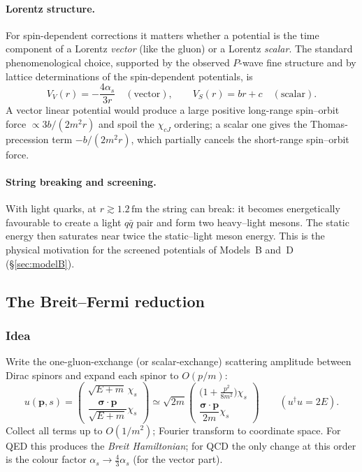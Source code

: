 \documentclass[11pt,a4paper]{article}
\numberwithin{equation}{section}
\theoremstyle{definition}
\theoremstyle{plain}
\theoremstyle{remark}
\numberwithin{algorithm}{section}
\newcommand{\vp}{\bm p}
\newcommand{\vsig}{\bm\sigma}
\newcommand{\as}{\alpha_s}
\newcommand{\fm}{\,\mathrm{fm}}
\begin{document}
\paragraph{Lorentz structure.} For spin-dependent corrections it matters whether a potential is the time component of a Lorentz \emph{vector} (like the gluon) or a Lorentz \emph{scalar}. The standard phenomenological choice, supported by the observed $P$-wave fine structure and by lattice determinations of the spin-dependent potentials, is
\begin{equation}
V_V(r)=-\frac{4\as}{3r}\quad(\text{vector}),\qquad V_S(r)=br+c\quad(\text{scalar}).
\end{equation}
A vector linear potential would produce a large positive long-range spin--orbit force $\propto 3b/(2m^2r)$ and spoil the $\chi_{cJ}$ ordering; a scalar one gives the Thomas-precession term $-b/(2m^2r)$, which partially cancels the short-range spin--orbit force.

\paragraph{String breaking and screening.} With light quarks, at $r\gtrsim1.2\fm$ the string can break: it becomes energetically favourable to create a light $q\bar q$ pair and form two heavy--light mesons. The static energy then saturates near twice the static--light meson energy. This is the physical motivation for the screened potentials of Models~B and~D (\S\ref{sec:modelB}).

\subsection{The Breit--Fermi reduction}\label{sec:BF}
\subsubsection{Idea}
Write the one-gluon-exchange (or scalar-exchange) scattering amplitude between Dirac spinors and expand each spinor to $O(p/m)$:
\begin{equation}
u(\vp,s)=\begin{pmatrix}\sqrt{E+m}\,\chi_s\\[1mm] \dfrac{\vsig\cdot\vp}{\sqrt{E+m}}\chi_s\end{pmatrix}\simeq\sqrt{2m}\begin{pmatrix}\big(1+\frac{p^2}{8m^2}\big)\chi_s\\[1mm] \dfrac{\vsig\cdot\vp}{2m}\chi_s\end{pmatrix}\qquad(u^\dagger u=2E).
\end{equation}
Collect all terms up to $O(1/m^2)$; Fourier transform to coordinate space. For QED this produces the \emph{Breit Hamiltonian}; for QCD the only change at this order is the colour factor $\as\to\frac43\as$ (for the vector part).
\end{document}
